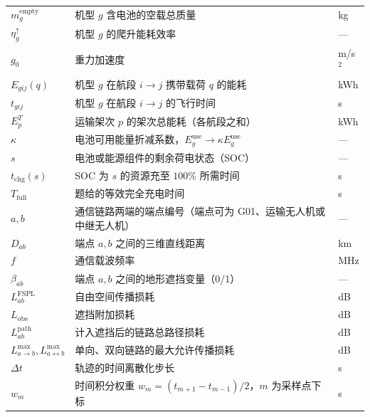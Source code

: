 \begin{table}[htbp]
\begin{tabularx}{\textwidth}{@{}l X l@{}}
		$m_g^{\mathrm{empty}}$ & 机型 $g$ 含电池的空载总质量 & kg \\
		$\eta^{\uparrow}_g$ & 机型 $g$ 的爬升能耗效率 & --- \\
		$g_0$ & 重力加速度 & m/s$^2$ \\
		$E_{gij}(q)$ & 机型 $g$ 在航段 $i\to j$ 携带载荷 $q$ 的能耗 & kWh \\
		$t_{gij}$ & 机型 $g$ 在航段 $i\to j$ 的飞行时间 & s \\
		$E^{T}_p$ & 运输架次 $p$ 的架次总能耗（各航段之和） & kWh \\
		$\kappa$ & 电池可用能量折减系数，$E_g^{\mathrm{use}}\to\kappa E_g^{\mathrm{use}}$ & --- \\
		$s$ & 电池或能源组件的剩余荷电状态（SOC） & --- \\
		$t_{\mathrm{chg}}(s)$ & SOC 为 $s$ 的资源充至 $100\%$ 所需时间 & s \\
		$T_{\mathrm{full}}$ & 题给的等效完全充电时间 & s \\
		$a,b$ & 通信链路两端的端点编号（端点可为 G01、运输无人机或中继无人机） & --- \\
		$D_{ab}$ & 端点 $a,b$ 之间的三维直线距离 & km \\
		$f$ & 通信载波频率 & MHz \\
		$\beta_{ab}$ & 端点 $a,b$ 之间的地形遮挡变量（0/1） & --- \\
		$L^{\mathrm{FSPL}}_{ab}$ & 自由空间传播损耗 & dB \\
		$L_{\mathrm{obs}}$ & 遮挡附加损耗 & dB \\
		$L^{\mathrm{path}}_{ab}$ & 计入遮挡后的链路总路径损耗 & dB \\
		$L^{\max}_{a\to b},L^{\max}_{a\leftrightarrow b}$ & 单向、双向链路的最大允许传播损耗 & dB \\
		$\Delta t$ & 轨迹的时间离散化步长 & s \\
		$w_m$ & 时间积分权重 $w_m=(t_{m+1}-t_{m-1})/2$，$m$ 为采样点下标 & s \\
		\bottomrule
	\end{tabularx}
\end{table}

